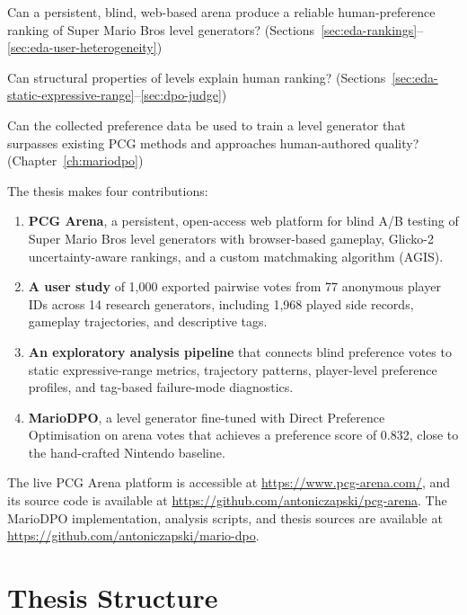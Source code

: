\documentclass[shortabstract, mgr, english]{iithesis}
\begin{document}
\begin{description}[style=nextline]
  \item[RQ1 (Measurement)] Can a persistent, blind, web-based arena produce a
    reliable human-preference ranking of Super Mario Bros level generators?
    (Sections~\ref{sec:eda-rankings}--\ref{sec:eda-user-heterogeneity})
  \item[RQ2 (Metrics)] Can structural properties of levels explain human ranking?
    (Sections~\ref{sec:eda-static-expressive-range}--\ref{sec:dpo-judge})
  \item[RQ3 (Generation)] Can the collected preference data be used to train a
    level generator that surpasses existing PCG methods and approaches
    human-authored quality? (Chapter~\ref{ch:mariodpo})
\end{description}

\noindent The thesis makes four contributions:

\begin{enumerate}
    \item \textbf{PCG Arena}, a persistent, open-access web platform for blind
          A/B testing of Super Mario Bros level generators with
          browser-based gameplay, Glicko-2 uncertainty-aware rankings, and a
          custom matchmaking algorithm (AGIS).
    \item \textbf{A user study} of 1,000 exported pairwise votes from 77
          anonymous player IDs across 14 research generators, including 1,968
          played side records, gameplay trajectories, and descriptive
          tags.
    \item \textbf{An exploratory analysis pipeline} that connects blind preference
          votes to static expressive-range metrics, trajectory patterns,
          player-level preference profiles, and tag-based failure-mode
          diagnostics.
    \item \textbf{MarioDPO}, a level generator fine-tuned with Direct Preference
          Optimisation on arena votes that achieves a preference score of 0.832,
          close to the hand-crafted Nintendo baseline.
\end{enumerate}

The live PCG Arena platform is accessible at
\url{https://www.pcg-arena.com/}, and its source code is available at
\url{https://github.com/antoniczapski/pcg-arena}.
The MarioDPO implementation, analysis scripts, and thesis sources are
available at \url{https://github.com/antoniczapski/mario-dpo}.

\section{Thesis Structure}
\label{sec:intro-structure}
\end{document}
